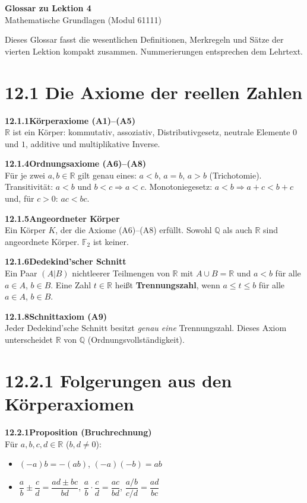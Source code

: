 \documentclass[a4paper,12pt]{article}
\newcommand{\gentry}[3]{%
  \noindent\textbf{#1\quad #2}\nopagebreak\\[0.2em]
  #3\par\smallskip
}
\begin{document}
\begin{center}
  {\LARGE\bfseries Glossar zu Lektion 4}\\[0.5em]
  {\large Mathematische Grundlagen (Modul 61111)}
\end{center}

\vspace{1em}

Dieses Glossar fasst die wesentlichen Definitionen, Merkregeln und Sätze der
vierten Lektion kompakt zusammen. Nummerierungen entsprechen dem Lehrtext.

\section*{12.1 \quad Die Axiome der reellen Zahlen}

\gentry{12.1.1}{Körperaxiome (A1)--(A5)}{%
  $\mathbb{R}$ ist ein Körper: kommutativ, assoziativ, Distributivgesetz, neutrale Elemente
  $0$ und $1$, additive und multiplikative Inverse.
}

\gentry{12.1.4}{Ordnungsaxiome (A6)--(A8)}{%
  Für je zwei $a, b \in \mathbb{R}$ gilt genau eines: $a < b$, $a = b$, $a > b$ (Trichotomie).
  Transitivität: $a < b$ und $b < c \Rightarrow a < c$.
  Monotoniegesetz: $a < b \Rightarrow a + c < b + c$ und, für $c > 0$: $ac < bc$.
}

\gentry{12.1.5}{Angeordneter Körper}{%
  Ein Körper $K$, der die Axiome (A6)--(A8) erfüllt.
  Sowohl $\mathbb{Q}$ als auch $\mathbb{R}$ sind angeordnete Körper. $\mathbb{F}_2$ ist keiner.
}

\gentry{12.1.6}{Dedekind'scher Schnitt}{%
  Ein Paar $(A|B)$ nichtleerer Teilmengen von $\mathbb{R}$ mit $A \cup B = \mathbb{R}$
  und $a < b$ für alle $a \in A$, $b \in B$.
  Eine Zahl $t \in \mathbb{R}$ heißt \textbf{Trennungszahl}, wenn $a \leq t \leq b$
  für alle $a \in A$, $b \in B$.
}

\gentry{12.1.8}{Schnittaxiom (A9)}{%
  Jeder Dedekind'sche Schnitt besitzt \emph{genau eine} Trennungszahl.
  Dieses Axiom unterscheidet $\mathbb{R}$ von $\mathbb{Q}$ (Ordnungsvollständigkeit).
}

\section*{12.2.1 \quad Folgerungen aus den Körperaxiomen}

\gentry{12.2.1}{Proposition (Bruchrechnung)}{%
  Für $a,b,c,d \in \mathbb{R}$ ($b,d \neq 0$):
  \begin{itemize}[topsep=2pt,itemsep=1pt]
    \item $(-a)b = -(ab)$, \quad $(-a)(-b) = ab$
    \item $\dfrac{a}{b} \pm \dfrac{c}{d} = \dfrac{ad \pm bc}{bd}$, \quad
          $\dfrac{a}{b} \cdot \dfrac{c}{d} = \dfrac{ac}{bd}$, \quad
          $\dfrac{a/b}{c/d} = \dfrac{ad}{bc}$
  \end{itemize}
}
\end{document}
